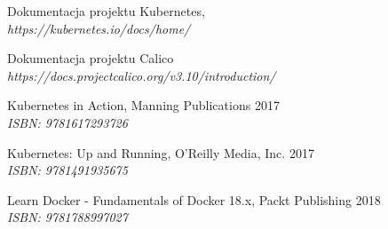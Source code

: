 \documentclass[pl,final,oneside]{mgr} %
\begin{document}
\begin{thebibliography}{99}
	Dokumentacja projektu Kubernetes,
	\\ \textit{https://kubernetes.io/docs/home/}
	
	Dokumentacja projektu Calico \\
	\textit{https://docs.projectcalico.org/v3.10/introduction/}

	Kubernetes in Action, Manning Publications 2017 \\
	\textit{ISBN: 9781617293726}
	
	Kubernetes: Up and Running, O'Reilly Media, Inc. 2017 \\
	\textit{ISBN: 9781491935675}
	
	Learn Docker - Fundamentals of Docker 18.x, Packt Publishing 2018\\
	\textit{ISBN: 9781788997027}

\end{thebibliography}
\end{document}
